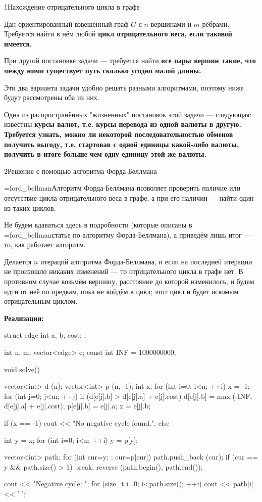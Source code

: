 \h1{Нахождение отрицательного цикла в графе}

Дан ориентированный взвешенный граф $G$ с $n$ вершинами и $m$ рёбрами. Требуется найти в нём любой \bf{цикл отрицательного веса}, если таковой имеется.

При другой постановке задачи --- требуется найти \bf{все пары вершин} такие, что между ними существует путь сколько угодно малой длины.

Эти два варианта задачи удобно решать разными алгоритмами, поэтому ниже будут рассмотрены оба из них.

Одна из распространённых "жизненных" постановок этой задачи --- следующая: известны \bf{курсы валют}, т.е. курсы перевода из одной валюты в другую. Требуется узнать, можно ли некоторой последовательностью обменов получить выгоду, т.е. стартовав с одной единицы какой-либо валюты, получить в итоге больше чем одну единицу этой же валюты.


\h2{Решение с помощью алгоритма Форда-Беллмана}

\algohref=ford_bellman{Алгоритм Форда-Беллмана} позволяет проверить наличие или отсутствие цикла отрицательного веса в графе, а при его наличии --- найти один из таких циклов.

Не будем вдаваться здесь в подробности (которые описаны в \algohref=ford_bellman{статье по алгоритму Форда-Беллмана}), а приведём лишь итог --- то, как работает алгоритм.

Делается $n$ итераций алгоритма Форда-Беллмана, и если на последней итерации не произошло никаких изменений --- то отрицательного цикла в графе нет. В противном случае возьмём вершину, расстояние до которой изменилось, и будем идти от неё по предкам, пока не войдём в цикл; этот цикл и будет искомым отрицательным циклом.

\bf{Реализация}:

\code
struct edge {
	int a, b, cost;
};

int n, m;
vector<edge> e;
const int INF = 1000000000;

void solve() {
	vector<int> d (n);
	vector<int> p (n, -1);
	int x;
	for (int i=0; i<n; ++i) {
		x = -1;
		for (int j=0; j<m; ++j)
			if (d[e[j].b] > d[e[j].a] + e[j].cost) {
				d[e[j].b] = max (-INF, d[e[j].a] + e[j].cost);
				p[e[j].b] = e[j].a;
				x = e[j].b;
			}
	}

	if (x == -1)
		cout << "No negative cycle found.";
	else {
		int y = x;
		for (int i=0; i<n; ++i)
			y = p[y];

		vector<int> path;
		for (int cur=y; ; cur=p[cur]) {
			path.push_back (cur);
			if (cur == y && path.size() > 1)  break;
		}
		reverse (path.begin(), path.end());
		
		cout << "Negative cycle: ";
		for (size_t i=0; i<path.size(); ++i)
			cout << path[i] << ' ';
	}
}
\endcode


